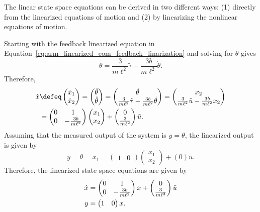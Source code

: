 
The linear state space equations can be derived in two different ways: (1) directly from the linearized equations of motion and (2) by linearizing the nonlinear equations of motion.

Starting with the feedback linearized equation in Equation~\eqref{eq:arm_linearized_eom_feedback_linarization} and solving for $\ddot{\theta}$ gives
\[
\ddot{\theta} = \frac{3}{m\ell^2}\tilde{\tau} - \frac{3b}{m\ell^2}\dot{\theta}.
\]
Therefore,
\begin{align*}
\dot{x} &\defeq \begin{pmatrix} \dot{x}_1 \\ \dot{x}_2 \end{pmatrix} 
= \begin{pmatrix}\dot{\theta} \\ \ddot{\theta}\end{pmatrix} 
= \begin{pmatrix} \dot{\theta} \\ \frac{3}{m\ell^2}\tilde{\tau} - \frac{3b}{m\ell^2}\dot{\theta}  \end{pmatrix}
=\begin{pmatrix} x_2 \\ \frac{3}{m\ell^2}\tilde{u} - \frac{3b}{m\ell^2}x_2  \end{pmatrix} \\
&= \begin{pmatrix} 0 & 1 \\ 0 & -\frac{3b}{m\ell^2} \end{pmatrix} \begin{pmatrix} x_1 \\ x_2 \end{pmatrix} + \begin{pmatrix} 0 \\ \frac{3}{m\ell^2} \end{pmatrix} \tilde{u}.
\end{align*}
Assuming that the measured output of the system is $y=\theta$, the linearized output is given by
\[
y = \theta = x_1 = \begin{pmatrix} 1 & 0\end{pmatrix}\begin{pmatrix}x_1 \\ x_2 \end{pmatrix} + (0)\tilde{u}.
\]
Therefore, the linearized state space equations are given by
\begin{align}
\dot{x} &= \begin{pmatrix} 0 & 1 \\ 0 & -\frac{3b}{m\ell^2} \end{pmatrix} x + \begin{pmatrix} 0 \\ \frac{3}{m\ell^2} \end{pmatrix} \tilde{u} 
\notag \\
y &= \begin{pmatrix} 1 & 0\end{pmatrix} x.
\label{eq:dm_arm_linearized_ss}
\end{align}

